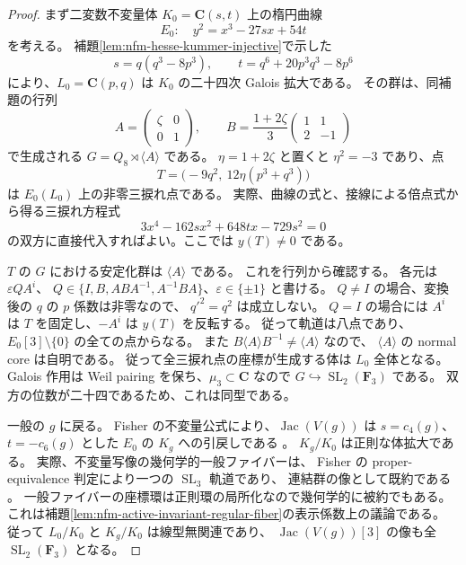 \begin{proof}
まず二変数不変量体 $K_0=\mathbf C(s,t)$ 上の楕円曲線
\[
 E_0:\quad y^2=x^3-27sx+54t
\]
を考える。
補題\ref{lem:nfm-hesse-kummer-injective}で示した
\[
 s=q(q^3-8p^3),\qquad t=q^6+20p^3q^3-8p^6
\]
により、$L_0=\mathbf C(p,q)$ は $K_0$ の二十四次 Galois 拡大である。
その群は、同補題の行列
\[
 A=\begin{pmatrix}\zeta&0\\0&1\end{pmatrix},\qquad
 B=\frac{1+2\zeta}{3}\begin{pmatrix}1&1\\2&-1\end{pmatrix}
\]
で生成される $G=Q_8\rtimes\langle A\rangle$ である。
$\eta=1+2\zeta$ と置くと $\eta^2=-3$ であり、点
\begin{equation}\label{eq:nfm-universal-jacobian-three-torsion}
 T=\bigl(-9q^2,\ 12\eta(p^3+q^3)\bigr)
\end{equation}
は $E_0(L_0)$ 上の非零三捩れ点である。
実際、曲線の式と、接線による倍点式から得る三捩れ方程式
\[
 3x^4-162sx^2+648tx-729s^2=0
\]
の双方に直接代入すればよい。ここでは $y(T)\ne0$ である。

$T$ の $G$ における安定化群は $\langle A\rangle$ である。
これを行列から確認する。
各元は $\varepsilon Q A^i$、
$Q\in\{I,B,ABA^{-1},A^{-1}BA\}$、$\varepsilon\in\{\pm1\}$ と書ける。
$Q\ne I$ の場合、変換後の $q$ の $p$ 係数は非零なので、
$q'^2=q^2$ は成立しない。
$Q=I$ の場合には $A^i$ は $T$ を固定し、$-A^i$ は $y(T)$ を反転する。
従って軌道は八点であり、$E_0[3]\setminus\{0\}$ の全ての点からなる。
また $B\langle A\rangle B^{-1}\ne\langle A\rangle$ なので、
$\langle A\rangle$ の normal core は自明である。
従って全三捩れ点の座標が生成する体は $L_0$ 全体となる。
Galois 作用は Weil pairing を保ち、$\mu_3\subset\mathbf C$ なので
$G\hookrightarrow\operatorname{SL}_2(\mathbf F_3)$ である。
双方の位数が二十四であるため、これは同型である。

一般の $g$ に戻る。
Fisher の不変量公式により、$\operatorname{Jac}(V(g))$ は
$s=c_4(g)$、$t=-c_6(g)$ とした $E_0$ の $K_g$ への引戻しである
\cite[Theorem~1.1(iv)]{NFMFisherTernary}。
$K_g/K_0$ は正則な体拡大である。
実際、不変量写像の幾何学的一般ファイバーは、
Fisher の proper-equivalence 判定により一つの $\operatorname{SL}_3$ 軌道であり、
連結群の像として既約である
\cite[Lemma~2.2]{NFMFisherTernary}。
一般ファイバーの座標環は正則環の局所化なので幾何学的に被約でもある。
これは補題\ref{lem:nfm-active-invariant-regular-fiber}の表示係数上の議論である。
従って $L_0/K_0$ と $K_g/K_0$ は線型無関連であり、
$\operatorname{Jac}(V(g))[3]$ の像も全 $\operatorname{SL}_2(\mathbf F_3)$ となる。


\end{proof}
